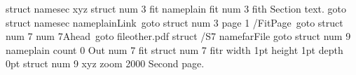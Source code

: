 \documentclass{article}
\begin{document}
\immediate{}
\edef\se{\the\pdflastobj}
\pdfdest struct \se\space name{sec} xyz
\pdfdest struct \se\space num 3 fit
\pdfdest name{plain} fit
\pdfdest num 3 fith
Section text.
\pdfstartlink goto struct name{sec} name{plain}\relax Link\pdfendlink\
\pdfstartlink goto struct num 3 page 1 {/Fit}\relax Page\pdfendlink\
\pdfstartlink goto struct num 7 num 7\relax Ahead\pdfendlink\
\pdfstartlink goto file{other.pdf} struct {/S7} name{far}\relax File\pdfendlink
\pdfoutline goto struct num 9 name{plain} count 0 {Out}
\newpage
\pdfdest num 7 fit
\pdfdest struct \se\space num 7 fitr width 1pt height 1pt depth 0pt
\pdfdest struct \se\space num 9 xyz zoom 2000
Second page.
\end{document}
